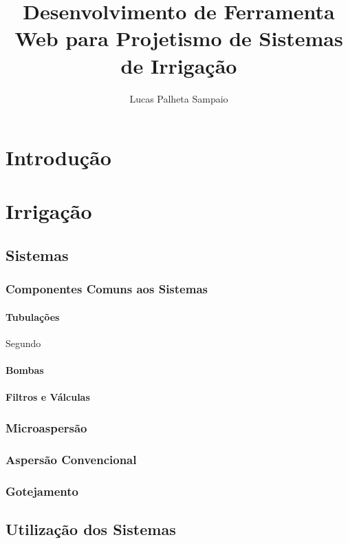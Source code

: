 \documentclass[12pt,a4paper]{book}
\author{Lucas Palheta Sampaio}
\title{Desenvolvimento de Ferramenta Web para Projetismo de Sistemas de Irrigação}
\begin{document}
\maketitle 
\tableofcontents

\chapter{Introdução}



\chapter{Irrigação}

\section{Sistemas}
\subsection{Componentes Comuns aos Sistemas}
\subsubsection{Tubulações}
Segundo \cite{da2013analise}
\subsubsection{Bombas}

\subsubsection{Filtros e Válculas}
\subsection{Microaspersão}

\subsection{Aspersão Convencional}

\subsection{Gotejamento}


\section{Utilização dos Sistemas}
\end{document}
